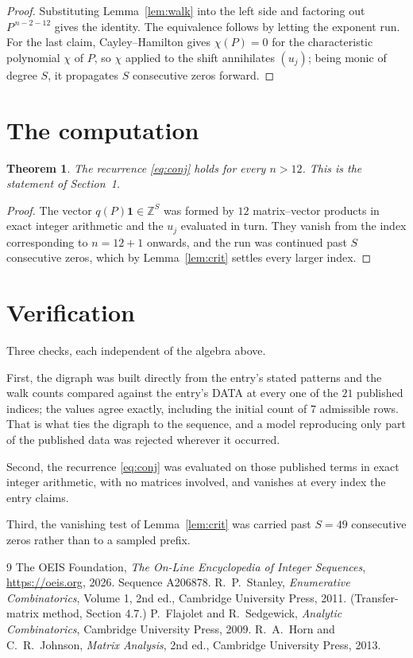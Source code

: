 \documentclass[11pt,a4paper]{article}
\theoremstyle{plain}
\newtheorem{theorem}{Theorem}
\theoremstyle{definition}
\begin{document}
\begin{proof}
Substituting Lemma~\ref{lem:walk} into the left side and factoring out
$P^{\,n-2-12}$ gives the identity. The equivalence follows by letting the exponent
run. For the last claim, Cayley--Hamilton gives $\chi(P)=0$ for the characteristic
polynomial $\chi$ of $P$, so $\chi$ applied to the shift annihilates $(u_j)$; being monic of
degree $S$, it propagates $S$ consecutive zeros forward.
\end{proof}

\section{The computation}

\begin{theorem}
The recurrence \eqref{eq:conj} holds for every $n>12$. This is the statement of
Section~1.
\end{theorem}

\begin{proof}
The vector $q(P)\mathbf{1}\in\mathbb{Z}^{S}$ was formed by $12$ matrix--vector
products in exact integer arithmetic and the $u_j$ evaluated in turn. They vanish from the
index corresponding to $n=12+1$ onwards, and the run was continued past $S$ consecutive
zeros, which by Lemma~\ref{lem:crit} settles every larger index.
\end{proof}

\section{Verification}

Three checks, each independent of the algebra above.

First, the digraph was built directly from the entry's stated patterns and the walk counts
compared against the entry's DATA at every one of the $21$ published indices; the
values agree exactly, including the initial count of $7$ admissible rows. That is
what ties the digraph to the sequence, and a model reproducing only part of the published
data was rejected wherever it occurred.

Second, the recurrence \eqref{eq:conj} was evaluated on those published terms in exact
integer arithmetic, with no matrices involved, and vanishes at every index the entry claims.

Third, the vanishing test of Lemma~\ref{lem:crit} was carried past $S=49$ consecutive
zeros rather than to a sampled prefix.

\begin{thebibliography}{9}
 The OEIS Foundation, \emph{The On-Line Encyclopedia of Integer
Sequences}, \url{https://oeis.org}, 2026. Sequence A206878.
 R.~P.~Stanley, \emph{Enumerative Combinatorics}, Volume 1, 2nd ed.,
Cambridge University Press, 2011. (Transfer-matrix method, Section 4.7.)
 P.~Flajolet and R.~Sedgewick, \emph{Analytic Combinatorics}, Cambridge
University Press, 2009.
 R.~A.~Horn and C.~R.~Johnson, \emph{Matrix Analysis}, 2nd ed., Cambridge
University Press, 2013.
\end{thebibliography}
\end{document}
